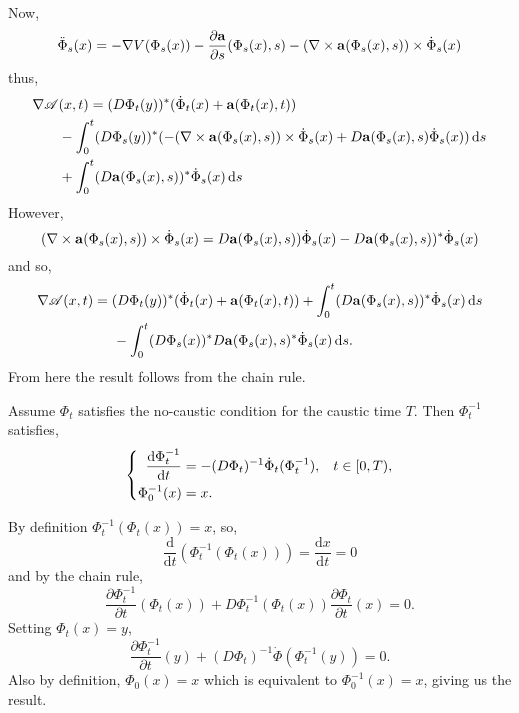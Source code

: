 \documentclass[a4paper,12pt,draft]{report}
\theoremstyle{remark}
\theoremstyle{definition}
\begin{document}
{\begin{align}
\end{align}
Now,
$$
\ddot{\Phi}_s(x) = -\nabla V(\Phi_s(x)) - \frac{\partial \bold{a}}{\partial s}(\Phi_s(x), s) - (\nabla \times \bold{a}(\Phi_s(x), s))\times\dot{\Phi}_s(x)
$$
thus,
\begin{align}
\nabla\mathscr{A} & (x, t) = (D\Phi_t(y))^*(\dot{\Phi}_t(x) + \bold{a}(\Phi_t(x), t))\nonumber\\
& - \int_0^t(D\Phi_s(y))^*(- (\nabla \times \bold{a}(\Phi_s(x), s))\times\dot{\Phi}_s(x) + D\bold{a}(\Phi_s(x), s)\dot{\Phi}_s(x))\,\mathrm{d}s\nonumber\\
& + \int_0^t(D\bold{a}(\Phi_s(x), s))^*\dot{\Phi}_s(x)\,\mathrm{d}s\nonumber
\end{align}
However,
$$
(\nabla\times\bold{a}(\Phi_s(x), s))\times\dot{\Phi}_s(x) = D\bold{a}(\Phi_s(x), s))\dot{\Phi}_s(x) - D\bold{a}(\Phi_s(x), s))^*\dot{\Phi}_s(x)
$$
and so,
\begin{align}
\nabla\mathscr{A}(x, t) & = (D\Phi_t(y))^*(\dot{\Phi}_t(x) + \bold{a}(\Phi_t(x), t)) + \int_0^t(D\bold{a}(\Phi_s(x), s))^*\dot{\Phi}_s(x)\,\mathrm{d}s\nonumber\\
& \hspace{0.5cm} - \int_0^t(D\Phi_s(x))^*D\bold{a}(\Phi_s(x), s)^*\dot{\Phi}_s(x)\,\mathrm{d}s.\nonumber
\end{align}
From here the result follows from the chain rule.

\qedhere
}
\lemma
{
Assume $\Phi_t$ satisfies the no-caustic condition for the caustic time $T$.  Then $\Phi_t^{-1}$ satisfies,
$$
\left\{
\begin{aligned}
\frac{\mathrm{d}\Phi_t^{-1}}{\mathrm{d}t} & = -(D\Phi_t)^{-1}\dot{\Phi}_t(\Phi_t^{-1}), \hspace{0.3cm} t \in [0, T),\\
\Phi_0^{-1}(x) & = x.
\end{aligned}
\right.
$$
}
\proof
{
By definition $\Phi_t^{-1}(\Phi_t(x)) = x$, so,
$$
\frac{\mathrm{d}}{\mathrm{d}t}(\Phi_t^{-1}(\Phi_t(x))) = \frac{\mathrm{d}x}{\mathrm{d}t} = 0
$$
and by the chain rule,
$$
\frac{\partial\Phi_t^{-1}}{\partial t}(\Phi_t(x)) + D\Phi_t^{-1}(\Phi_t(x))\frac{\partial\Phi_t}{\partial t}(x) = 0.
$$
Setting $\Phi_t(x) = y$,
$$
\frac{\partial\Phi_t^{-1}}{\partial t}(y) + (D\Phi_t)^{-1}\dot{\Phi}(\Phi_t^{-1}(y)) = 0.
$$
Also by definition, $\Phi_0(x) = x$ which is equivalent to $\Phi_0^{-1}(x) = x$, giving us the result.

\qedhere
}
\end{document}
